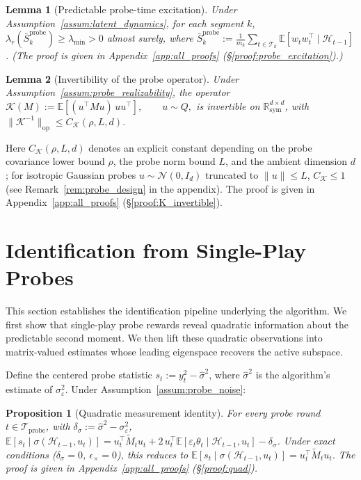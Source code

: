 \documentclass{article}
\newcommand{\R}{\mathbb{R}}
\newcommand{\E}{\mathbb{E}}
\newcommand{\op}{\mathrm{op}}
\newcommand{\cH}{\mathcal{H}}
\newcommand{\cT}{\mathcal{T}}
\newcommand{\cTprobe}{\mathcal{T}_{\mathrm{probe}}}
\newtheorem{lemma}{Lemma}
\newtheorem{proposition}{Proposition}
\begin{document}
\begin{lemma}[Predictable probe-time excitation]\label{lem:probe_excitation}
Under Assumption~\ref{assum:latent_dynamics}, for each segment $k$, $\lambda_r(\bar S_k^{\mathrm{probe}})\ge \lambda_{\min} > 0$ almost surely, where $\bar S_k^{\mathrm{probe}} := \frac{1}{m_k}\sum_{t\in \cT_k}\E[w_t w_t^\top \mid \cH_{t-1}]$. (The proof is given in Appendix~\ref{app:all_proofs} (\S\ref{proof:probe_excitation}).)
\end{lemma}


\begin{lemma}[Invertibility of the probe operator]\label{lem:K_invertible}
Under Assumption~\ref{assum:probe_realizability}, the operator $\mathcal K(M):=\E[(u^\top M u)\,uu^\top], \qquad u\sim Q,$ is invertible on $\R_{\mathrm{sym}}^{d\times d}$, with $\|\mathcal K^{-1}\|_{\op} \le C_{\mathcal K}(\rho, L, d)$.
\end{lemma}
Here $C_{\mathcal K}(\rho, L, d)$ denotes an explicit constant depending on the probe covariance lower bound $\rho$, the probe norm bound $L$, and the ambient dimension $d$; for isotropic Gaussian probes $u \sim \mathcal{N}(0, I_d)$ truncated to $\|u\| \le L$, $C_{\mathcal K} \le 1$ (see Remark~\ref{rem:probe_design} in the appendix). The proof is given in Appendix~\ref{app:all_proofs} (\S\ref{proof:K_invertible}).
\section{Identification from Single-Play Probes}
\label{sec:identification}

This section establishes the identification pipeline underlying the algorithm.
We first show that single-play probe rewards reveal quadratic information about the predictable second moment.
We then lift these quadratic observations into matrix-valued estimates whose leading eigenspace recovers the active subspace.

Define the centered probe statistic $s_t := y_t^2 - \hat\sigma^2$, where $\hat\sigma^2$ is the algorithm's estimate of $\sigma_\varepsilon^2$.
Under Assumption~\ref{assum:probe_noise}:
\begin{proposition}[Quadratic measurement identity]
\label{prop:quad}
For every probe round $t \in \cTprobe$, with $\delta_\sigma := \hat\sigma^2 - \sigma_\varepsilon^2$,
$\E[s_t \mid \sigma(\cH_{t-1}, u_t)] = u_t^\top \widetilde{M}_t u_t + 2\,u_t^\top\E[\varepsilon_t\theta_t \mid \cH_{t-1}, u_t] - \delta_\sigma$.
Under exact conditions ($\delta_\sigma = 0$, $\epsilon_\times = 0$), this reduces to $\E[s_t \mid \sigma(\cH_{t-1}, u_t)] = u_t^\top \widetilde{M}_t u_t$.
The proof is given in Appendix~\ref{app:all_proofs} (\S\ref{proof:quad}).
\end{proposition} 
\end{document}
